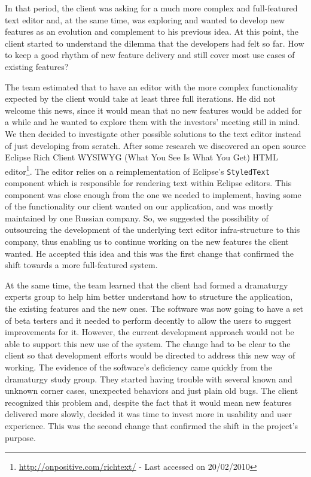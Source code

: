 \documentclass[lnbip]{svmultln}
\begin{document}
In that period, the client was asking for a much more complex and
full-featured text editor and, at the same time, was exploring and
wanted to develop new features as an evolution and complement to his
previous idea. At this point, the client started to understand the
dilemma that the developers had felt so far.  How to keep a good
rhythm of new feature delivery and still cover most use cases of
existing features?

The team estimated that to have an editor with the more complex
functionality expected by the client would take at least three full
iterations. He did not welcome this news, since it would mean that no
new features would be added for a while and he wanted to explore them
with the investors' meeting still in mind.  We then decided to
investigate other possible solutions to the text editor instead of
just developing from scratch. After some research we discovered an
open source Eclipse Rich Client WYSIWYG (What You See Is What You Get)
HTML editor\footnote{\url{http://onpositive.com/richtext/} - Last
  accessed on 20/02/2010}. The editor relies on a reimplementation of
Eclipse's \texttt{StyledText} component which is responsible for
rendering text within Eclipse editors. This component was close enough
from the one we needed to implement, having some of the functionality
our client wanted on our application, and was mostly maintained by one
Russian company. So, we suggested the possibility of outsourcing the
development of the underlying text editor infra-structure to this
company, thus enabling us to continue working on the new features the
client wanted. He accepted this idea and this was the first change
that confirmed the shift towards a more full-featured system.

At the same time, the team learned that the client had formed a
dramaturgy experts group to help him better understand how to
structure the application, the existing features and the new ones. The
software was now going to have a set of beta testers and it needed to
perform decently to allow the users to suggest improvements for
it. However, the current development approach would not be able to
support this new use of the system. The change had to be clear to the
client so that development efforts would be directed to address this
new way of working. The evidence of the software's deficiency came
quickly from the dramaturgy study group. They started having trouble
with several known and unknown corner cases, unexpected behaviors and
just plain old bugs. The client recognized this problem and, despite
the fact that it would mean new features delivered more slowly,
decided it was time to invest more in usability and user
experience. This was the second change that confirmed the shift in the
project's purpose.
\end{document}
